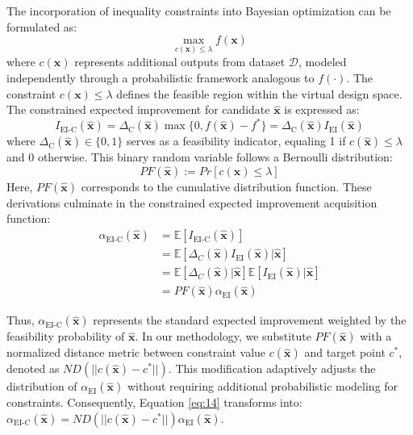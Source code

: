 \documentclass[preprint,review,12pt,authoryear]{elsarticle}
\begin{document}
The incorporation of inequality constraints into Bayesian optimization can be formulated as:
\begin{equation}
\max_{c(\boldsymbol{x}) \leq \lambda} f(\boldsymbol{x})
\label{eq:11}
\end{equation}
where $c(\boldsymbol{x})$ represents additional outputs from dataset $\mathcal{D}$, modeled independently through a probabilistic framework analogous to $f(\cdot)$. The constraint $c(\boldsymbol{x})\leq \lambda$ defines the feasible region within the virtual design space. The constrained expected improvement for candidate $\hat{\boldsymbol{x}}$ is expressed as:
\begin{equation}
I_{\text{EI-C}}(\hat{\boldsymbol{x}})=\Delta_\text{C}(\hat{\boldsymbol{x}})\max\{0, f(\hat{\boldsymbol{x}})-f^*\}=\Delta_\text{C}(\hat{\boldsymbol{x}})I_{\text{EI}}(\hat{\boldsymbol{x}})
    \label{eq:12}
\end{equation}
where $\Delta_\text{C}(\hat{\boldsymbol{x}})\in \{0,1\}$ serves as a feasibility indicator, equaling 1 if $c(\hat{\boldsymbol{x}})\leq \lambda$ and 0 otherwise. This binary random variable follows a Bernoulli distribution:
\begin{equation}
    PF(\hat{\boldsymbol{x}}):=Pr[c(\boldsymbol{x})\leq \lambda] 
    \label{eq:13}
\end{equation}
Here, $PF(\hat{\boldsymbol{x}})$ corresponds to the cumulative distribution function. These derivations culminate in the constrained expected improvement acquisition function:
\begin{equation}
\begin{aligned}
\alpha_{\text{EI-C}}(\hat{\boldsymbol{x}}) &=\mathbb{E}[I_\text{EI-C}(\hat{\boldsymbol{x}})]\\
&= \mathbb{E}[\Delta_{C}(\hat{\boldsymbol{x}})I_{\text{EI}}(\hat{\boldsymbol{x}})|\hat{\boldsymbol{x}}]\\
&= \mathbb{E}[\Delta_{C}(\hat{\boldsymbol{x}})|\hat{\boldsymbol{x}}]\mathbb{E}[I_\text{EI}(\hat{\boldsymbol{x}})|\hat{\boldsymbol{x}}]\\
&=PF(\hat{\boldsymbol{x}})\alpha_{\text{EI}}(\hat{\boldsymbol{x}})
\end{aligned}
\label{eq:14}
\end{equation}

Thus, $\alpha_{\text{EI-C}}(\hat{\boldsymbol{x}})$ represents the standard expected improvement weighted by the feasibility probability of $\hat{\boldsymbol{x}}$. In our methodology, we substitute $PF(\hat{\boldsymbol{x}})$ with a normalized distance metric between constraint value $c(\hat{\boldsymbol{x}})$ and target point $c^*$, denoted as $ND(||c(\hat{\boldsymbol{x}})-c^*||)$. This modification adaptively adjusts the distribution of $\alpha_{\text{EI}}(\hat{\boldsymbol{x}})$ without requiring additional probabilistic modeling for constraints. Consequently, Equation \ref{eq:14} transforms into:
$\alpha_{\text{EI-C}}(\hat{\boldsymbol{x}}) =ND(||c(\hat{\boldsymbol{x}})-c^*||)\alpha_{\text{EI}}(\hat{\boldsymbol{x}})$. 
\end{document}
